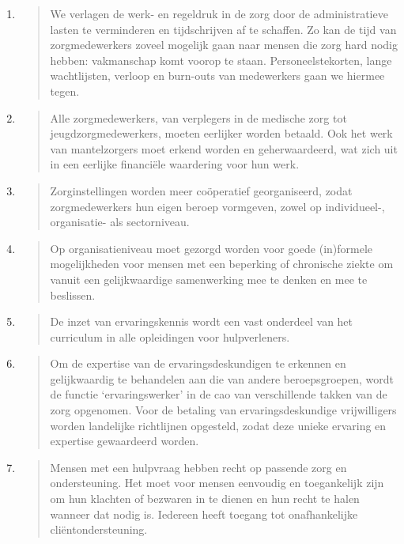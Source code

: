\begin{enumerate}
\def\labelenumi{\arabic{enumi}.}
\item
  \begin{quote}
  We verlagen de werk- en regeldruk in de zorg door de administratieve
  lasten te verminderen en tijdschrijven af te schaffen. Zo kan de tijd
  van zorgmedewerkers zoveel mogelijk gaan naar mensen die zorg hard
  nodig hebben: vakmanschap komt voorop te staan. Personeelstekorten,
  lange wachtlijsten, verloop en burn-outs van medewerkers gaan we
  hiermee tegen.
  \end{quote}
\item
  \begin{quote}
  Alle zorgmedewerkers, van verplegers in de medische zorg tot
  jeugdzorgmedewerkers, moeten eerlijker worden betaald. Ook het werk
  van mantelzorgers moet erkend worden en geherwaardeerd, wat zich uit
  in een eerlijke financiële waardering voor hun werk.
  \end{quote}
\item
  \begin{quote}
  Zorginstellingen worden meer coöperatief georganiseerd, zodat
  zorgmedewerkers hun eigen beroep vormgeven, zowel op individueel-,
  organisatie- als sectorniveau.
  \end{quote}
\item
  \begin{quote}
  Op organisatieniveau moet gezorgd worden voor goede (in)formele
  mogelijkheden voor mensen met een beperking of chronische ziekte om
  vanuit een gelijkwaardige samenwerking mee te denken en mee te
  beslissen.
  \end{quote}
\item
  \begin{quote}
  De inzet van ervaringskennis wordt een vast onderdeel van het
  curriculum in alle opleidingen voor hulpverleners.
  \end{quote}
\item
  \begin{quote}
  Om de expertise van de ervaringsdeskundigen te erkennen en
  gelijkwaardig te behandelen aan die van andere beroepsgroepen, wordt
  de functie `ervaringswerker' in de cao van verschillende takken van de
  zorg opgenomen. Voor de betaling van ervaringsdeskundige vrijwilligers
  worden landelijke richtlijnen opgesteld, zodat deze unieke ervaring en
  expertise gewaardeerd worden.
  \end{quote}
\item
  \begin{quote}
  Mensen met een hulpvraag hebben recht op passende zorg en
  ondersteuning. Het moet voor mensen eenvoudig en toegankelijk zijn om
  hun klachten of bezwaren in te dienen en hun recht te halen wanneer
  dat nodig is. Iedereen heeft toegang tot onafhankelijke
  cliëntondersteuning.
  \end{quote}
\end{enumerate}

